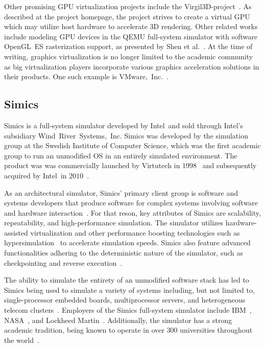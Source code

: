 Other promising GPU virtualization projects include the Virgil3D-project~.
As described at the project homepage, the project strives to create a virtual GPU which may utilize host hardware to accelerate 3D rendering.
Other related works include modeling GPU devices in the QEMU full-system simulator with software OpenGL~ES rasterization support, as presented by Shen et al.~.
At the time of writing, graphics virtualization is no longer limited to the academic community as big virtualization players incorporate various graphics acceleration solutions in their products.
One such example is VMware,~Inc.~.

\subsection{Simics}
\label{sec:simics}
Simics is a full-system simulator developed by Intel\circledR\ and sold through Intel\circledR 's subsidiary Wind~River~Systems,~Inc.
Simics was developed by the simulation group at the Swedish Institute of Computer Science, which was the first academic group to run an unmodified OS in an entirely simulated environment.
The product was was commercially launched by Virtutech in $1998$~ and subsequently acquired by Intel\circledR\ in $2010$~.

As an architectural simulator, Simics' primary client group is software and systems developers that produce software for complex systems involving software and hardware interaction~.
For that reson, key attributes of Simics are scalability, repeatability, and high-performance simulation.
The simulator utilizes hardware-assisted virtualization and other performance boosting technologies such as hypersimulation~ to accelerate simulation speeds.
Simics also feature advanced functionalities adhering to the deterministic nature of the simulator, such as checkpointing and reverse execution~.

The ability to simulate the entirety of an unmodified software stack has led to Simics being used to simulate a variety of systems including, but not limited to, single-processor embedded boards, multiprocessor servers, and heterogeneous telecom clusters~.
Employers of the Simics full-system simulator include IBM~, NASA~, and Lockheed Martin~.
Additionally, the simulator has a strong academic tradition, being known to operate in over $300$ universities throughout the world~.

